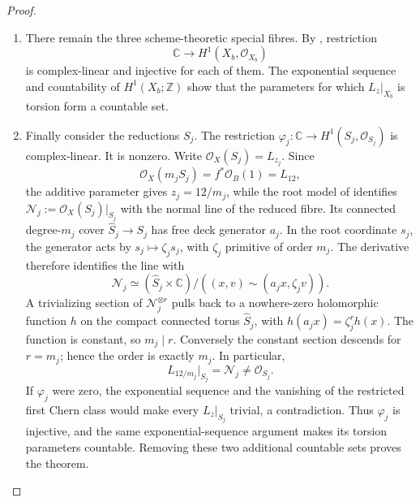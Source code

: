 \begin{proof}
\begin{enumerate}[label=\arabic*.,leftmargin=*]
\item There remain the three scheme-theoretic special fibres.  By
, restriction
\[
 \mathbb C\longrightarrow H^1(X_b,\mathcal O_{X_b})
\]
is complex-linear and injective for each of them.  The exponential sequence
and countability of \(H^1(X_b;\mathbb Z)\) show that the parameters for
which \(L_z|_{X_b}\) is torsion form a countable set.

\item Finally consider the reductions \(S_j\).  The restriction
\(\varphi_j:\mathbb C\to H^1(S_j,\mathcal O_{S_j})\) is complex-linear.
It is nonzero.  Write \(\mathcal O_X(S_j)=L_{z_j}\).  Since
\[
 \mathcal O_X(m_jS_j)=f^*\mathcal O_B(1)=L_{12},
\]
the additive parameter gives \(z_j=12/m_j\), while
the root model of  identifies
\(\mathcal N_j:=\mathcal O_X(S_j)|_{S_j}\) with the normal line of
the reduced fibre. Its connected degree-\(m_j\) cover
\(\widehat S_j\to S_j\) has free deck generator \(a_j\). In the
root coordinate \(s_j\), the generator acts by
\(s_j\mapsto\zeta_j s_j\), with \(\zeta_j\) primitive of order
\(m_j\). The derivative therefore identifies the line with
\[
 \mathcal N_j\simeq
 (\widehat S_j\times\mathbb C)/
       ((x,v)\sim(a_jx,\zeta_jv)).
\]
A trivializing section of \(\mathcal N_j^{\otimes r}\) pulls back
to a nowhere-zero holomorphic function \(h\) on the compact connected
torus \(\widehat S_j\), with \(h(a_jx)=\zeta_j^r h(x)\).
The function is constant, so \(m_j\mid r\). Conversely the constant
section descends for \(r=m_j\); hence the order is exactly \(m_j\).
In particular,
\[
 L_{12/m_j}|_{S_j}=\mathcal N_j\ne\mathcal O_{S_j}.
\]  If \(\varphi_j\) were zero, the exponential sequence and
the vanishing of the restricted first Chern class would make every
\(L_z|_{S_j}\) trivial, a contradiction.  Thus \(\varphi_j\) is
injective, and the same exponential-sequence argument makes its torsion
parameters countable.  Removing these two additional countable sets proves
the theorem.

\end{enumerate}
\end{proof}